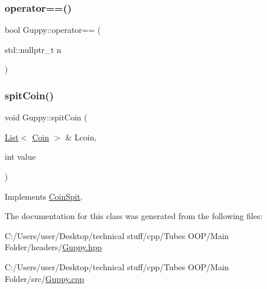 \mbox{\label{class_guppy_a8b7c06fba5a291556cd4bf5255ac153e}} 
\subsubsection{\texorpdfstring{operator==()}{operator==()}\hspace{0.1cm}{\footnotesize\ttfamily [2/2]}}
{\footnotesize\ttfamily bool Guppy\+::operator== (\begin{DoxyParamCaption}\item[{std\+::nullptr\+\_\+t}]{n }\end{DoxyParamCaption})}

\mbox{\label{class_guppy_a39dfc2b44aed14f056bddcc08ff7c598}} 
\subsubsection{\texorpdfstring{spit\+Coin()}{spitCoin()}}
{\footnotesize\ttfamily void Guppy\+::spit\+Coin (\begin{DoxyParamCaption}\item[{\mbox{\hyperlink{class_list}{List}}$<$ \mbox{\hyperlink{class_coin}{Coin}} $>$ \&}]{Lcoin,  }\item[{int}]{value }\end{DoxyParamCaption})\hspace{0.3cm}{\ttfamily [virtual]}}



Implements \mbox{\hyperlink{class_coin_spit_a336f45a90c4b0b57017b45a5c68f12a7}{Coin\+Spit}}.



The documentation for this class was generated from the following files\+:\begin{DoxyCompactItemize}
\item 
C\+:/\+Users/user/\+Desktop/technical stuff/cpp/\+Tubes O\+O\+P/\+Main Folder/headers/\mbox{\hyperlink{_guppy_8hpp}{Guppy.\+hpp}}\item 
C\+:/\+Users/user/\+Desktop/technical stuff/cpp/\+Tubes O\+O\+P/\+Main Folder/src/\mbox{\hyperlink{_guppy_8cpp}{Guppy.\+cpp}}\end{DoxyCompactItemize}
